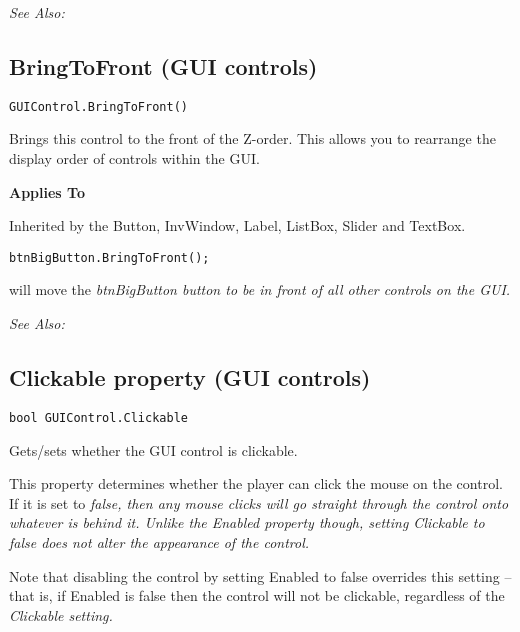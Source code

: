 \it{See Also:} 


\subsection{BringToFront (GUI controls)}\label{GUIControl.BringToFront}%

\begin{verbatim}
GUIControl.BringToFront()
\end{verbatim}
Brings this control to the front of the Z-order. This allows you to rearrange the display order
of controls within the GUI.

\bf{Applies To}

Inherited by the Button, InvWindow, Label, ListBox, Slider and TextBox.

\begin{verbatim}
btnBigButton.BringToFront();
\end{verbatim}
will move the \it{btnBigButton} button to be in front of all other controls on the GUI.

\it{See Also:} 


\subsection{Clickable property (GUI controls)}\label{GUIControl.Clickable}%

\begin{verbatim}
bool GUIControl.Clickable
\end{verbatim}
Gets/sets whether the GUI control is clickable.

This property determines whether the player can click the mouse on the control. If it is set to \it{false},
then any mouse clicks will go straight through the control onto whatever is behind it. Unlike the Enabled
property though, setting Clickable to false does not alter the appearance of the control.

Note that disabling the control by setting Enabled to false overrides this setting -- that is, if Enabled
is false then the control will not be clickable, regardless of the \it{Clickable} setting.

